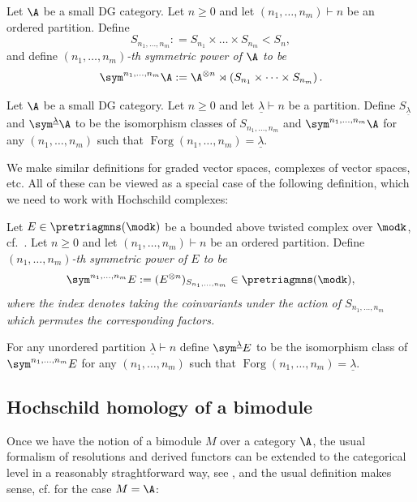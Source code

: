 \documentclass[12pt,a4paper,reqno]{amsart}
\DeclareMathOperator{\forget}{{Forg}}
\begin{document}
\begin{defn}
Let $\A$ be a small DG category.  
Let $n \geq 0$ and let $(n_1, \dots, n_m) \vdash n$ be an ordered
partition. Define 
$$ S_{n_1, \dots, n_m} : = S_{n_1} \times \dots \times S_{n_m} < S_n,  $$
and define \em $(n_1, \dots, n_m)$-th symmetric power of $\A$ \rm to be 
$$ \sym^{n_1, \dots, n_m} \A : = 
\A^{\otimes n} \rtimes \left( S_{n_1} \times \dots \times S_{n_m} \right). $$
\end{defn}
\begin{defn}
Let $\A$ be a small DG category.  
Let $n \geq 0$ and let $\underline{\lambda}  \vdash n$ be a partition. 
Define $S_{\underline{\lambda} }$ and $\sym^{\underline{\lambda} } \A$ to be the
isomorphism classes of $S_{n_1, \dots, n_m}$ and 
$\sym^{n_1, \dots, n_m} \A$ for any $(n_1, \dots, n_m)$
such that $\forget(n_1, \dots, n_m) = \underline{\lambda}$. 
\end{defn}

We make similar definitions for graded vector spaces, complexes of
vector spaces, etc. All of these can be viewed as a special case 
of the following definition, which we need to work with Hochschild
complexes: 

\begin{defn}
Let $E \in \pretriagmns(\modk)$ 
be a bounded above twisted complex over $\modk$,
cf.~\cite[\S3]{AnnoLogvinenko-UnboundedTwistedComplexes}. 
Let $n \geq 0$ and let $(n_1, \dots, n_m) \vdash n$ be an ordered
partition. Define 
\em $(n_1, \dots, n_m)$-th symmetric power of $E$ \rm to be 
$$ \sym^{n_1, \dots, n_m} E : = 
(E^{\otimes n})_{S_{n_1, \dots, n_m}} \in \pretriagmns(\modk),$$
where the index denotes taking the coinvariants under the action 
of $S_{n_1, \dots, n_m}$ which permutes the corresponding factors. 

For any unordered partition $\underline{\lambda} \vdash n$
define $\sym^{\underline{\lambda}} E$ to be the isomorphism class of 
$\sym^{n_1, \dots, n_m} E$ for any $(n_1, \dots, n_m)$
such that $\forget(n_1, \dots, n_m) = \underline{\lambda}$.
\end{defn}



\subsection{Hochschild homology of a bimodule}

Once we have the notion of a bimodule $M$ over a category $\A$, the usual 
formalism of resolutions and derived functors can be extended to the categorical
level in a reasonably straghtforward way, see 
\cite[\S2 and \S3]{Keller-DerivingDGCategories},
 and the usual definition makes sense, cf.
 \cite[\S6.8]{Keller-HochschildCohomologyAndDerivedCategories}
 for the case 
$M = \A$:
\end{document}
